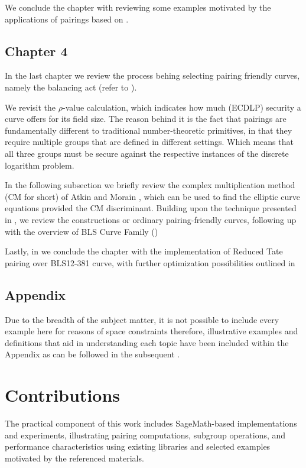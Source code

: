 We conclude the chapter with   reviewing some examples motivated by the  applications of pairings based on \cite{theory.pairings.for.beginners}.


\subsection*{Chapter 4}
In the last chapter we review the process behing selecting pairing friendly curves, namely the balancing act (refer to ). 

We revisit the $\rho$-value calculation, which indicates how much (ECDLP) security a curve offers for its field size. The reason behind it is the fact that pairings are fundamentally different to traditional number-theoretic primitives, in that they require multiple groups that are defined in different settings.
Which means that all three groups must be secure against the respective instances of the discrete 
logarithm problem.

In the following subsection  we briefly review the complex multiplication method (CM for short) of Atkin and Morain \cite{AM93}, which can be used to find the elliptic curve equations provided the CM discriminant.  Building upon the technique presented in , we review the constructions or ordinary pairing-friendly curves, following up with the overview of BLS Curve Family () 

Lastly, in  we conclude the chapter with the implementation of  Reduced Tate pairing over BLS12-381 curve, with further optimization possibilities outlined in 


\subsection*{Appendix}

Due to the breadth of the subject matter, it is not possible to include every example here for reasons of space constraints therefore, illustrative examples and definitions that aid in understanding each topic have been included within the Appendix as can be followed in the subsequent .

\section{Contributions}
\label{ssec:ch00.contributions}
The practical component of this work includes SageMath-based\cite{tools.sagemath} implementations and experiments, illustrating pairing computations, subgroup operations, and performance characteristics using existing libraries and selected examples motivated by the referenced materials.

